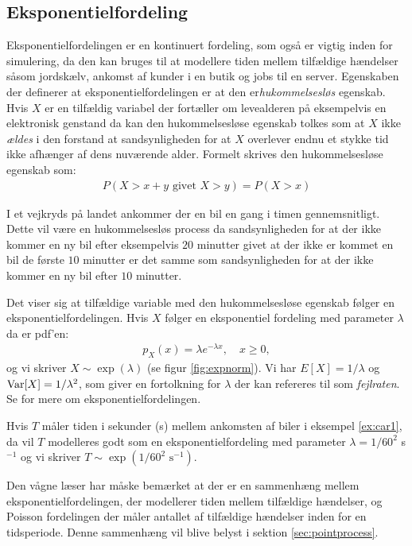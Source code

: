 \subsection{Eksponentielfordeling}
Eksponentielfordelingen er en kontinuert fordeling, som også er vigtig inden for simulering, da den kan bruges til at modellere tiden mellem tilfældige hændelser såsom jordskælv, ankomst af kunder i en butik og jobs til en server. Egenskaben der definerer at eksponentielfordelingen er at den er\emph{hukommelsesløs} egenskab. Hvis $X$ er en tilfældig variabel der fortæller om levealderen på eksempelvis en elektronisk genstand da kan den hukommelsesløse egenskab tolkes som at $X$ ikke \emph{ældes} i den forstand at sandsynligheden for at $X$ overlever endnu et stykke tid ikke afhænger af dens nuværende alder. Formelt skrives den hukommelsesløse egenskab som: 
\begin{align*}
P(X > x + y \text{ givet } X > y) = P(X > x)
\end{align*}
\begin{example} \label{ex:car1}
I et vejkryds på landet ankommer der en bil en gang i timen gennemsnitligt. Dette vil være en hukommelsesløs process da sandsynligheden for at der ikke kommer en ny bil efter eksempelvis $20$ minutter givet at der ikke er kommet en bil de første $10$ minutter er det samme som sandsynligheden for at der ikke kommer en ny bil efter $10$ minutter. 
\end{example}
Det viser sig at tilfældige variable med den hukommelsesløse egenskab følger en eksponentielfordelingen. Hvis $X$ følger en eksponentiel fordeling med parameter $\lambda$ da er pdf'en:
\begin{align*}
p_X(x) = \lambda e^{-\lambda x}, \quad x \geq 0,
\end{align*}
og vi skriver $X \sim \exp(\lambda)$ (se figur \ref{fig:expnorm}). Vi har $E[X] = 1/\lambda$ og $\operatorname{Var}[X] = 1/\lambda^2$, som giver en fortolkning for $\lambda$ der kan refereres til som \emph{fejlraten}. Se \cite[123-127]{olofsson2012} for mere om eksponentielfordelingen. 
\begin{example} \label{ex:car2}
Hvis $T$ måler tiden i sekunder (s) mellem ankomsten af biler i eksempel \ref{ex:car1}, da vil $T$ modelleres godt som en eksponentielfordeling med parameter $\lambda = 1/60^2$ s$^{-1}$ og vi skriver $T \sim \exp(1/60^{2} \text{ s}^{-1})$. 
\end{example}
Den vågne læser har måske bemærket at der er en sammenhæng mellem eksponentielfordelingen, der modellerer tiden mellem tilfældige hændelser, og Poisson fordelingen der måler antallet af tilfældige hændelser inden for en tidsperiode. Denne sammenhæng vil blive belyst i sektion \ref{sec:pointprocess}. 
